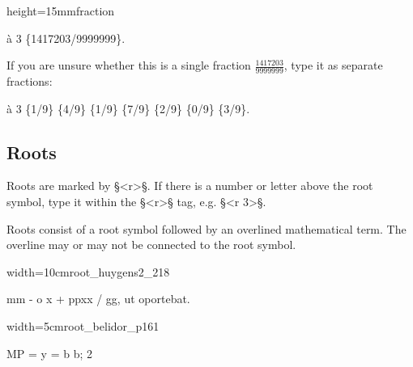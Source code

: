 \begin{sampleImageSmall}{height=15mm}{fraction}

\begin{typeMath}
à 3 \{1417203/9999999\}.
\end{typeMath}

If you are unsure whether this is a single fraction $\frac{1417203}{9999999}$, type it as separate fractions:

\begin{typeMath}
à 3 \{1/9\} \{4/9\} \{1/9\} \{7/9\} \{2/9\} \{0/9\} \{3/9\}.
\end{typeMath}

\end{sampleImageSmall}


\tocspace
\subsection{Roots}
\label{section roots}

\begin{mainrule}
Roots are marked by §<r>§. If there is a number or letter above the root symbol, type it within the §<r>§ tag, e.g. §<r 3>§.
\end{mainrule}

\begin{clarification}
Roots consist of a root symbol followed by an overlined mathematical term. The overline may or may not be connected to the root symbol.
\end{clarification}


\vspace{3mm}
\begin{sampleImageSmall}[1]{width=10cm}{root_huygens2_218}
\begin{typeLatin}
mm\bold{_} - \bold{_}o x\bold{_} + \bold{\{} \bold{_}ppxx\bold{_} / \bold{_}gg, ut oportebat. \\
\end{typeLatin}
\end{sampleImageSmall}

\vspace{3mm}
\begin{sampleImageSmall}[2]{width=5cm}{root_belidor_p161}
\begin{typeLatin}
MP = y = b b; \bold{/} 2 \bold{\}} \\
\end{typeLatin}
\end{sampleImageSmall}

